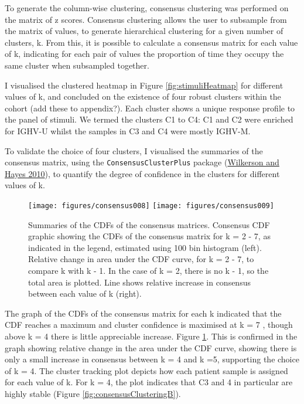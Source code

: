 \documentclass[11pt, a4paper, twosided]{book}
\begin{document}
To generate the column-wise clustering, consensus clustering was performed on the matrix of z scores. Consensus clustering allows the user to subsample from the matrix of values, to generate hierarchical clustering for a given number of clusters, k. From this, it is possible to calculate a consensus matrix for each value of k, indicating for each pair of values the proportion of time they occupy the same cluster when subsampled together.

I visualised the clustered heatmap in Figure \ref{fig:stimuliHeatmap} for different values of k, and concluded on the existence of four robust clusters within the cohort (add these to appendix?). Each cluster shows a unique response profile to the panel of stimuli. We termed the clusters C1 to C4: C1 and C2 were enriched for IGHV-U whilst the samples in C3 and C4 were mostly IGHV-M.

To validate the choice of four clusters, I visualised the summaries of the consensus matrix, using the \texttt{ConsensusClusterPlus} package (\protect\hyperlink{ref-ConsensusClusterPlus}{Wilkerson and Hayes 2010}), to quantify the degree of confidence in the clusters for different values of k.


\begin{figure}

{\centering \texttt{[image: figures/consensus008]} \texttt{[image: figures/consensus009]} 

}

\caption{Summaries of the CDFs of the consensus matrices. Consensus CDF graphic showing the CDFs of the consensus matrix for k = 2 - 7, as indicated in the legend, estimated using 100 bin histogram (left). Relative change in area under the CDF curve, for k = 2 - 7, to compare k with k - 1. In the case of k = 2, there is no k - 1, so the total area is plotted. Line shows relative increase in consensus between each value of k (right).}\label{fig:consensusClusteringA}
\end{figure}
The graph of the CDFs of the consensus matrix for each k indicated that the CDF reaches a maximum and cluster confidence is maximised at k = 7 , though above k = 4 there is little appreciable increase. Figure \ref{fig:consensusClusteringA}. This is confirmed in the graph showing relative change in the area under the CDF curve, showing there is only a small increase in consensus between k = 4 and k =5, supporting the choice of k = 4. The cluster tracking plot depicts how each patient sample is assigned for each value of k. For k = 4, the plot indicates that C3 and 4 in particular are highly stable (Figure \ref{fig:consensusClusteringB}).
\end{document}
